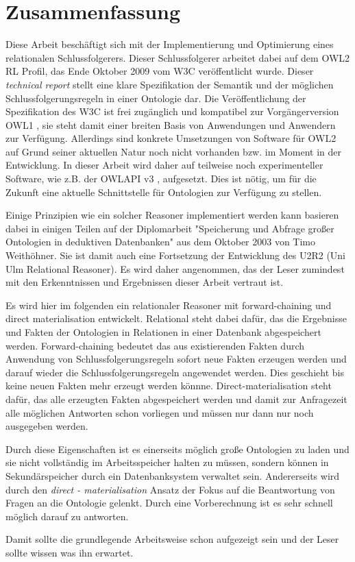 \section*{Zusammenfassung}
Diese Arbeit beschäftigt sich mit der Implementierung und Optimierung eines relationalen Schlussfolgerers. Dieser Schlussfolgerer arbeitet dabei auf dem OWL2 RL Profil, das Ende Oktober 2009 vom W3C \cite{OWL2Profiles} veröffentlicht wurde. Dieser \emph{technical report} stellt eine klare Spezifikation der Semantik und der möglichen Schlussfolgerungsregeln in einer Ontologie dar. Die Veröffentlichung der Spezifikation des W3C ist frei zugänglich und kompatibel zur Vorgängerversion OWL1 \cite{OWL1}, sie steht damit einer breiten Basis von Anwendungen und Anwendern zur Verfügung. Allerdings sind konkrete Umsetzungen von Software für OWL2 auf Grund seiner aktuellen Natur noch nicht vorhanden bzw. im Moment in der Entwicklung. In dieser Arbeit wird daher auf teilweise noch experimenteller Software, wie z.B. der OWLAPI v3 \cite{OWLAPI}, aufgesetzt. Dies ist nötig, um für die Zukunft eine aktuelle Schnittstelle für Ontologien zur Verfügung zu stellen.

Einige Prinzipien wie ein solcher Reasoner implementiert werden kann basieren dabei in einigen Teilen auf der Diplomarbeit "Speicherung und Abfrage großer Ontologien in deduktiven Datenbanken" aus dem Oktober 2003 von Timo Weithöhner. Sie ist damit auch eine Fortsetzung der Entwicklung des U2R2 (Uni Ulm Relational Reasoner). Es wird daher angenommen, das der Leser zumindest mit den Erkenntnissen und Ergebnissen dieser Arbeit vertraut ist.

Es wird hier im folgenden ein relationaler Reasoner mit forward-chaining und direct materialisation entwickelt. Relational steht dabei dafür, das die Ergebnisse und Fakten der Ontologien in Relationen in einer Datenbank abgespeichert werden. Forward-chaining bedeutet das aus existierenden Fakten durch Anwendung von Schlussfolgerungsregeln sofort neue Fakten erzeugen werden und darauf wieder die Schlussfolgerungsregeln angewendet werden. Dies geschieht bis keine neuen Fakten mehr erzeugt werden könnne. Direct-materialisation steht dafür, das alle erzeugten Fakten abgespeichert werden und damit zur Anfragezeit alle möglichen Antworten schon vorliegen und müssen nur dann nur noch ausgegeben werden.

Durch diese Eigenschaften ist es einerseits möglich große Ontologien zu laden und sie nicht vollständig im Arbeitsspeicher halten zu müssen, sondern können in Sekundärspeicher durch ein Datenbanksystem verwaltet sein. Andererseits wird durch den \emph{direct - materialisation} Ansatz der Fokus auf die Beantwortung von Fragen an die Ontologie gelenkt. Durch eine Vorberechnung ist es sehr schnell möglich darauf zu antworten.

Damit sollte die grundlegende Arbeitsweise schon aufgezeigt sein und der Leser sollte wissen was ihn erwartet.